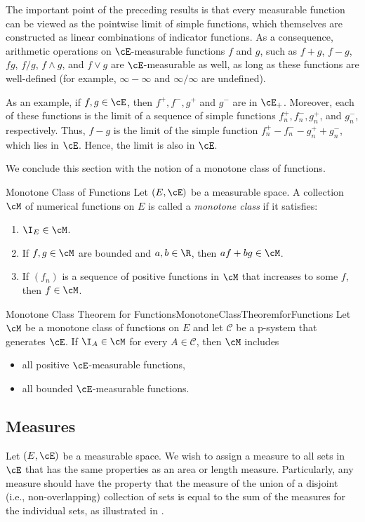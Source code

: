 The important point of the preceding results is that every measurable function can be viewed as the pointwise limit of simple functions, which themselves are constructed as linear combinations of indicator functions. As a consequence, arithmetic operations on \(\cE\)-measurable functions \(f\) and \(g\), such as \(f + g\), \(f - g\), \(fg\), \(f/g\), \(f \wedge g\), and \(f \vee g\) are \(\cE\)-measurable as well, as long as these functions are well-defined (for example, \(\infty - \infty\) and \(\infty/\infty\) are undefined).

As an example, if \(f, g \in \cE\), then \(f^+, f^-, g^+\) and \(g^-\) are in \(\cE_+\). Moreover, each of these functions is the limit of a sequence of simple functions \(f_n^+, f_n^-, g_n^+\), and \(g_n^-\), respectively. Thus, \(f - g\) is the limit of the simple function \(f_n^+ - f_n^- - g_n^+ + g_n^-\), which lies in \(\cE\). Hence, the limit is also in \(\cE\).

We conclude this section with the notion of a monotone class of functions.

\begin{defn}{Monotone Class of Functions}{}
	Let \((E, \cE)\) be a measurable space. A collection \(\cM\) of numerical functions on \(E\) is called a \textit{monotone class} if it satisfies:
	\begin{enumerate}
		\item \(\I_E \in \cM\).
		\item If \(f, g \in \cM\) are bounded and \(a, b \in \R\), then \(af + bg \in \cM\).
		\item If \((f_n)\) is a sequence of positive functions in \(\cM\) that increases to some \(f\), then \(f \in \cM\).
	\end{enumerate}
\end{defn}

\begin{thm}{Monotone Class Theorem for Functions}{MonotoneClassTheoremforFunctions}
	Let \(\cM\) be a monotone class of functions on \(E\) and let \(\mathcal{C}\) be a p-system that generates \(\cE\). If \(\I_A \in \cM\) for every \(A \in \mathcal{C}\), then \(\cM\) includes
	\begin{itemize}
		\item all positive \(\cE\)-measurable functions,
		\item all bounded \(\cE\)-measurable functions.
	\end{itemize}
\end{thm}

\subsection{Measures}
Let \((E,\cE)\) be a measurable space. We wish to assign a measure to all sets in \(\cE\) that has the same properties as an area or length measure. Particularly, any measure should have the property that the measure of the union of a disjoint (i.e., non-overlapping) collection of sets is equal to the sum of the measures for the individual sets, as illustrated in .

